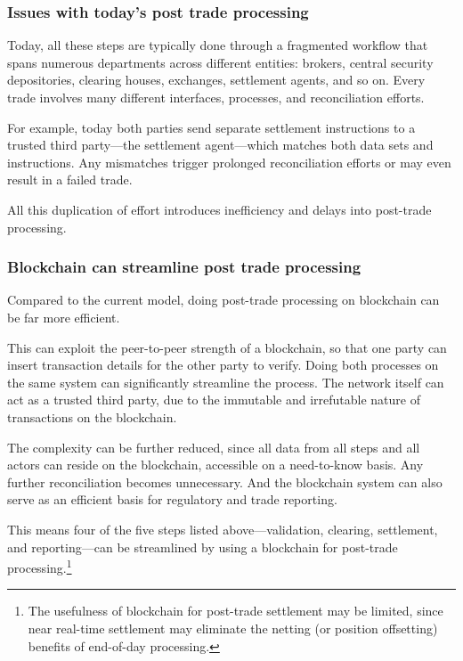 \subsubsection{Issues with today's post trade processing}

Today, all these steps are typically done through a fragmented workflow that spans numerous departments across different entities: brokers, central security depositories, clearing houses, exchanges, settlement agents, and so on. Every trade involves many different interfaces, processes, and reconciliation efforts. 

For example, today both parties send separate settlement instructions to a trusted third party---the settlement agent---which matches both data sets and instructions. Any mismatches trigger prolonged reconciliation efforts or may even result in a failed trade. 

All this duplication of effort introduces inefficiency and delays into post-trade processing.

\subsubsection{Blockchain can streamline post trade processing}

Compared to the current model, doing post-trade processing on blockchain can be far more efficient.

This can exploit the peer-to-peer strength of a blockchain, so that one party can insert transaction details for the other party to verify. Doing both processes on the same system can significantly streamline the process. The network itself can act as a trusted third party, due to the immutable and irrefutable nature of transactions on the blockchain.

The complexity can be further reduced, since all data from all steps and all actors can reside on the blockchain, accessible on a need-to-know basis. Any further reconciliation becomes unnecessary. And the blockchain system can also serve as an efficient basis for regulatory and trade reporting.

This means four of the five steps listed above---validation, clearing, settlement, and reporting---can be streamlined by using a blockchain for post-trade processing.\footnote{The usefulness of blockchain for post-trade settlement may be limited, since near real-time settlement may eliminate the netting (or position offsetting) benefits of end-of-day processing.} 

